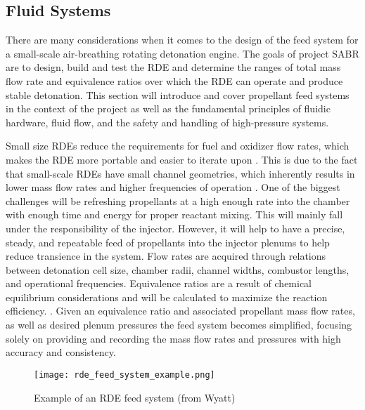\subsection{Fluid Systems}

There are many considerations when it comes to the design of the feed system for a small-scale air-breathing rotating detonation engine. The goals of project SABR are to design, build and test the RDE and determine the ranges of total mass flow rate and equivalence ratios over which the RDE can operate and produce stable detonation. This section will introduce and cover propellant feed systems in the context of the project as well as the fundamental principles of fluidic hardware, fluid flow, and the safety and handling of high-pressure systems.

Small size RDEs reduce the requirements for fuel and oxidizer flow rates, which makes the RDE more portable and easier to iterate upon \cite{dechert:2020}. This is due to the fact that small-scale RDEs have small channel geometries, which inherently results in lower mass flow rates and higher frequencies of operation \cite{dechert:2020, fiorino:2021, fiorino:2022}. One of the biggest challenges will be refreshing propellants at a high enough rate into the chamber with enough time and energy for proper reactant mixing. This will mainly fall under the responsibility of the injector. However, it will help to have a precise, steady, and repeatable feed of propellants into the injector plenums to help reduce transience in the system. Flow rates are acquired through relations between detonation cell size, chamber radii, channel widths, combustor lengths, and operational frequencies. Equivalence ratios are a result of chemical equilibrium considerations and will be calculated to maximize the reaction efficiency. \cite{yokoo:2019}. Given an equivalence ratio and associated propellant mass flow rates, as well as desired plenum pressures the feed system becomes simplified, focusing solely on providing and recording the mass flow rates and pressures with high accuracy and consistency.

\begin{figure}[ht]
    \centering
    \texttt{[image: rde\_feed\_system\_example.png]}
    \caption{Example of an RDE feed system (from Wyatt)}
    \label{fig:rde-feed-system-example}
\end{figure}


